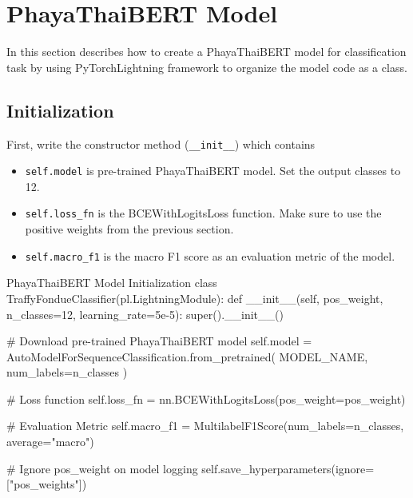 \documentclass[12pt, a4paper]{article}
\begin{document}
    \pagebreak

        \section{PhayaThaiBERT Model}
            In this section describes how to create a PhayaThaiBERT model for classification task
            by using PyTorchLightning framework to organize the model code as a class.

            \subsection{Initialization}
                First, write the constructor method (\texttt{\_\_init\_\_}) which contains
                \begin{itemize}
                    \item \texttt{self.model} is pre-trained PhayaThaiBERT model. Set the output classes to 12.
                    \item \texttt{self.loss\_fn} is the BCEWithLogitsLoss function.
                    Make sure to use the positive weights from the previous section.
                    \item \texttt{self.macro\_f1} is the macro F1 score as an evaluation metric of the model.
                \end{itemize}

                \begin{codeblock}{PhayaThaiBERT Model Initialization}
                    class TraffyFondueClassifier(pl.LightningModule):
                        def __init__(self, pos_weight, n_classes=12, learning_rate=5e-5):
                            super().__init__()

                            # Download pre-trained PhayaThaiBERT model
                            self.model = AutoModelForSequenceClassification.from_pretrained(
                                MODEL_NAME, num_labels=n_classes
                            )

                            # Loss function
                            self.loss_fn = nn.BCEWithLogitsLoss(pos_weight=pos_weight)

                            # Evaluation Metric
                            self.macro_f1 = MultilabelF1Score(num_labels=n_classes, average="macro")

                            # Ignore pos_weight on model logging
                            self.save_hyperparameters(ignore=["pos_weights"])
                \end{codeblock}
\end{document}
